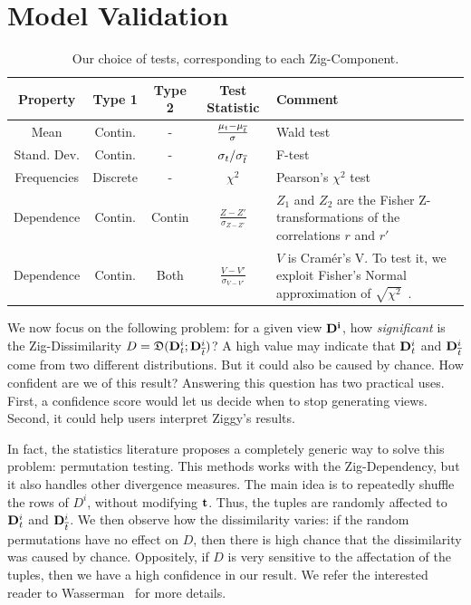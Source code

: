 \section{Model Validation}
\label{sec:validation}
\begin{table}[t!]
    \centering
    \begin{tabular}{c c c c p{9.5cm}}
      \hline
      Property & Type 1 & Type 2 & Test Statistic & Comment\\
      \hline
      Mean & Contin.  & - & $\frac{\mu_t - \mu_{\overline{t}}}{\sigma}$ &
        Wald test~\cite{wasserman2013all}  \\
        Stand. Dev.& Contin.  & - & $\sigma_t / \sigma_{\overline{t}}$ &
        F-test~\cite{wasserman2013all} \\
        Frequencies & Discrete & - & $\chi^2$ & Pearson's $\chi^2$
        test~\cite{wasserman2013all}\\
      \hline
      Dependence  & Contin. & Contin & $\frac{Z - Z'}{\sigma_{Z - Z'}}$ & $Z_1$
      and $Z_2$ are the Fisher Z-transformations of the correlations $r$ and
      $r'$~\cite{fisher1915frequency}  \\
      Dependence  & Contin. & Both &  $\frac{V-V'}{\sigma_{V-V'}}$ & $V$ is
      Cram\'er's V. To test it, we exploit Fisher's
      Normal approximation of $\sqrt{\chi^2}$~\cite{patel1996handbook}.\\ 
      \hline
    \end{tabular}
\caption{Our choice of tests, corresponding to each Zig-Component.}
    \label{tab:tests}
\end{table}

We now focus on the following problem: for a given view $\mathbf{D^i}$, how
\emph{significant} is the Zig-Dissimilarity $D = \mathfrak{D}( \mathbf{D}^i_t  ;
\mathbf{D}^i_{\overline{t}})$? A high value may indicate that $\mathbf{D}^i_t$ and
$\mathbf{D}^i_{\overline{t}}$ come from two different distributions.  But it could
also be caused by chance. How confident are we of this result? Answering this
question has two practical uses. First, a confidence score would let us decide
when to stop generating views. Second, it could help users
interpret Ziggy's results.

In fact, the statistics literature proposes a completely ge\-ne\-ric way to solve
this problem: permutation testing. This methods works with the Zig-Dependency,
but it also handles other divergence measures. The main idea is to
repeatedly shuffle the rows of $D^i$, without modifying $\mathbf{t}$. Thus, the
tuples are randomly affected to $\mathbf{D}^i_t$ and $\mathbf{D}^i_{\overline{t}}$. We
then observe how the dissimilarity varies: if the random permutations have no
effect on $D$, then there is high chance that the dissimilarity was caused by
chance.  Oppositely, if $D$ is very sensitive to the affectation of the tuples,
then we have a high confidence in our result. We refer the interested
reader to Wasserman~\cite{wasserman2013all} for more details.

